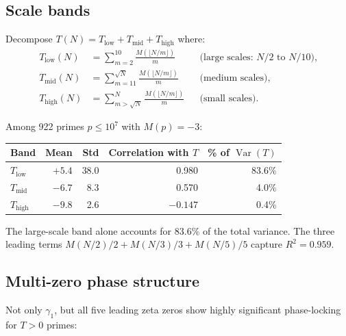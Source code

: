 \documentclass[11pt]{article}
\theoremstyle{definition}
\DeclareMathOperator{\Var}{Var}
\begin{document}
\subsection{Scale bands}

Decompose $T(N) = T_{\mathrm{low}} + T_{\mathrm{mid}} + T_{\mathrm{high}}$
where:
\begin{align*}
  T_{\mathrm{low}}(N) &= \sum_{m=2}^{10}
    \frac{M(\lfloor N/m \rfloor)}{m}
    & &\text{(large scales: $N/2$ to $N/10$),} \\
  T_{\mathrm{mid}}(N) &= \sum_{m=11}^{\sqrt{N}}
    \frac{M(\lfloor N/m \rfloor)}{m}
    & &\text{(medium scales),} \\
  T_{\mathrm{high}}(N) &= \sum_{m > \sqrt{N}}^{N}
    \frac{M(\lfloor N/m \rfloor)}{m}
    & &\text{(small scales).}
\end{align*}

Among 922 primes $p \le 10^7$ with $M(p) = -3$:

\begin{center}
\begin{tabular}{lrrrr}
\toprule
Band & Mean & Std & Correlation with $T$ & \% of $\Var(T)$ \\
\midrule
$T_{\mathrm{low}}$ & $+5.4$ & 38.0 & 0.980 & 83.6\% \\
$T_{\mathrm{mid}}$ & $-6.7$ & 8.3 & 0.570 & 4.0\% \\
$T_{\mathrm{high}}$ & $-9.8$ & 2.6 & $-0.147$ & 0.4\% \\
\bottomrule
\end{tabular}
\end{center}

The large-scale band alone accounts for 83.6\% of the total variance.
The three leading terms $M(N/2)/2 + M(N/3)/3 + M(N/5)/5$ capture
$R^2 = 0.959$.


\subsection{Multi-zero phase structure}

Not only $\gamma_1$, but all five leading zeta zeros show highly
significant phase-locking for $T > 0$ primes:
\end{document}
